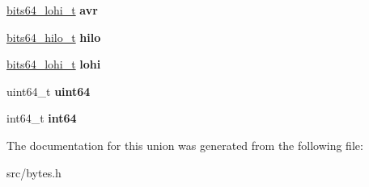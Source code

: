 \begin{DoxyCompactItemize}
\hyperlink{structbits64__lohi__s}{bits64\+\_\+lohi\+\_\+t} {\bfseries avr}
\item 
\hypertarget{unionbits64__s_acd5f277340bd777ff42bcc13c52c6081}{}\label{unionbits64__s_acd5f277340bd777ff42bcc13c52c6081} 
\hyperlink{structbits64__hilo__s}{bits64\+\_\+hilo\+\_\+t} {\bfseries hilo}
\item 
\hypertarget{unionbits64__s_a2d07870fec9fb72486013721a461acc1}{}\label{unionbits64__s_a2d07870fec9fb72486013721a461acc1} 
\hyperlink{structbits64__lohi__s}{bits64\+\_\+lohi\+\_\+t} {\bfseries lohi}
\item 
\hypertarget{unionbits64__s_a82a89fa3451230cc4c2717eeb8c03160}{}\label{unionbits64__s_a82a89fa3451230cc4c2717eeb8c03160} 
uint64\+\_\+t {\bfseries uint64}
\item 
\hypertarget{unionbits64__s_a180519c6f448161cf94b2f4b43555595}{}\label{unionbits64__s_a180519c6f448161cf94b2f4b43555595} 
int64\+\_\+t {\bfseries int64}
\end{DoxyCompactItemize}


The documentation for this union was generated from the following file\+:\begin{DoxyCompactItemize}
\item 
src/bytes.\+h\end{DoxyCompactItemize}
